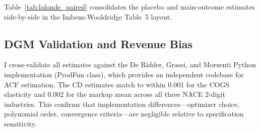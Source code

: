 \documentclass[11pt]{article}
\begin{document}
Table~\ref{tab:lalonde_paired} consolidates the placebo and main-outcome estimates side-by-side in the Imbens-Wooldridge \cite{ImbensWooldridge2007} Table~5 layout.

\subsection{DGM Validation and Revenue Bias}\label{app:dgm}

I cross-validate all estimates against the De Ridder, Grassi, and Morzenti \cite{DGM2026} Python implementation (ProdFun class), which provides an independent codebase for ACF estimation. The CD estimates match to within 0.001 for the COGS elasticity and 0.002 for the markup mean across all three NACE 2-digit industries. This confirms that implementation differences---optimizer choice, polynomial order, convergence criteria---are negligible relative to specification sensitivity.
\end{document}
